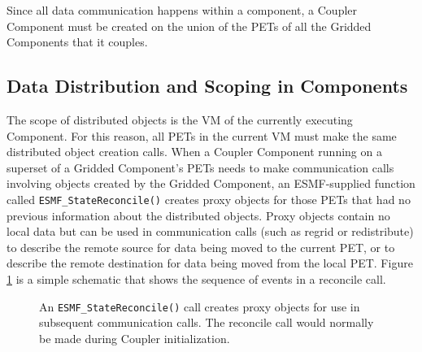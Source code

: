 Since all data communication happens within a component, a Coupler
Component must be created on the union of the PETs of all
the Gridded Components that it couples.  

\subsection{Data Distribution and Scoping in Components}
\label{sec:scoping}

The scope of distributed objects is the VM of the currently 
executing Component.  For this reason, all
PETs in the current VM must make the same distributed object
creation calls.   When a Coupler Component running on a superset
of a Gridded Component's PETs needs to make communication calls
involving objects created by the Gridded Component,
an ESMF-supplied function called {\tt ESMF\_StateReconcile()} creates proxy
objects for those PETs that had no previous information about the
distributed objects.  Proxy objects contain no local data but
can be used in communication calls (such as regrid or redistribute)
to describe the remote source for data being moved to the current PET,
or to describe the remote destination for data being moved from the local PET.
Figure \ref{fig:reconcile} is a simple schematic that shows the 
sequence of events in a reconcile call.

\begin{center}
\begin{figure}
\caption{An {\tt ESMF\_StateReconcile()} call creates proxy 
objects for use in subsequent communication calls.  The reconcile 
call would normally be made during Coupler initialization.}
\label{fig:reconcile}
\end{figure}
\end{center}

